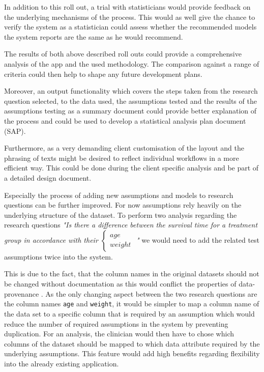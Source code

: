 In addition to this roll out, a trial with statisticians would provide feedback on the underlying mechanisms of the process. This would as well give the chance to verify the system as a statistician could assess whether the recommended models the system reports are the same as he would recommend. 

The results of both above described roll outs could provide a comprehensive analysis of the app and the used methodology. The comparison against a range of criteria could then help to shape any future development plans.

Moreover, an output functionality which covers the steps taken from the research question selected, to the data used, the assumptions tested and the results of the assumptions testing as a summary document could provide better explanation of the process and could be used to develop a statistical analysis plan document (SAP).

Furthermore, as a very demanding client customisation of the layout and the phrasing of texts might be desired to reflect individual workflows in a more efficient way. This could be done during the client specific analysis and be part of a detailed design document.


Especially the process of adding new assumptions and models to research questions can be further improved. For now assumptions rely heavily on the underlying structure of the dataset. To perform two analysis regarding the research questions \textit{"Is there a difference between the survival time for a treatment group in accordance with their {\tiny $\begin{cases} age\\weight \end{cases}$} "} we would need to add the related test assumptions twice into the system. 

This is due to the fact, that the column names in the original datasets should not be changed without documentation as this would conflict the properties of data-provenance \cite{provenance}. As the only changing aspect between the two research questions are the column names \texttt{age} and \texttt{weight}, it would be simpler to map a column name of the data set to a specific column that is required by an assumption which would reduce the number of required assumptions in the system by preventing duplication. For an analysis, the clinician would then have to chose which columns of the dataset should be mapped to which data attribute required by the underlying assumptions. This feature would add high benefits regarding flexibility into the already existing application.
